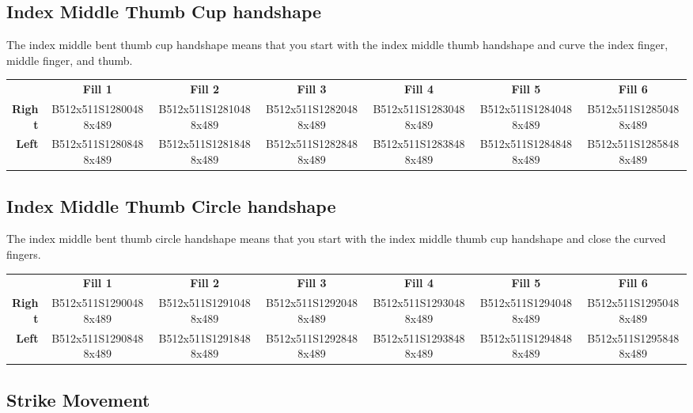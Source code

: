 \documentclass{article}
\begin{document}
\subsection{Index Middle Thumb Cup handshape}

The index middle bent thumb cup handshape means that you start with the index middle thumb handshape and curve the index finger, middle finger, and thumb.

\begin{center}
\begin{tabular}{r*{6}{c}}
&\textbf{Fill 1}&\textbf{Fill 2}&\textbf{Fill 3}&\textbf{Fill 4}&\textbf{Fill 5}&\textbf{Fill 6}\\
\textbf{Right}&
B512x511S12800488x489&
B512x511S12810488x489&
B512x511S12820488x489&
B512x511S12830488x489&
B512x511S12840488x489&
B512x511S12850488x489\\
\textbf{Left}&
B512x511S12808488x489&
B512x511S12818488x489&
B512x511S12828488x489&
B512x511S12838488x489&
B512x511S12848488x489&
B512x511S12858488x489\\
\end{tabular}
\end{center}

\subsection{Index Middle Thumb Circle handshape}

The index middle bent thumb circle handshape means that you start with the index middle thumb cup handshape and close the curved fingers.

\begin{center}
\begin{tabular}{r*{6}{c}}
&\textbf{Fill 1}&\textbf{Fill 2}&\textbf{Fill 3}&\textbf{Fill 4}&\textbf{Fill 5}&\textbf{Fill 6}\\
\textbf{Right}&
B512x511S12900488x489&
B512x511S12910488x489&
B512x511S12920488x489&
B512x511S12930488x489&
B512x511S12940488x489&
B512x511S12950488x489\\
\textbf{Left}&
B512x511S12908488x489&
B512x511S12918488x489&
B512x511S12928488x489&
B512x511S12938488x489&
B512x511S12948488x489&
B512x511S12958488x489\\
\end{tabular}
\end{center}

\subsection{Strike Movement}
\end{document}
